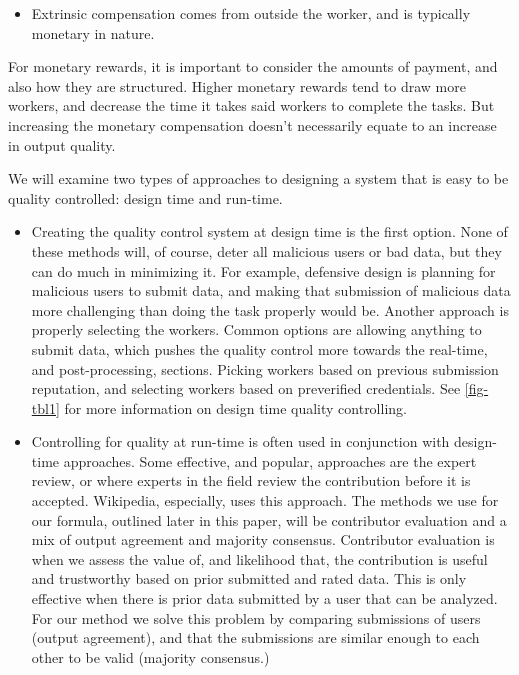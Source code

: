 \documentclass[9pt,twocolumn]{article}
\begin{document}
\begin{itemize}
\begin{itemize}
			\item Extrinsic compensation comes from outside the worker, and is typically monetary in nature.
		\end{itemize}
		For monetary rewards, it is important to consider the amounts of payment, and also how they are structured. Higher monetary rewards tend to draw more workers, and decrease the time it takes said workers to complete the tasks. But increasing the monetary compensation doesn't necessarily equate to an increase in output quality. \cite{mason2010financial}
	\end{itemize}
	
	We will examine two types of approaches to designing a system that is easy to be quality controlled: design time and run-time. 
	
	\begin{itemize}
		\item Creating the quality control system at design time is the first option. None of these methods will, of course, deter all malicious users or bad data, but they can do much in minimizing it. For example, defensive design is planning for malicious users to submit data, and making that submission of malicious data more challenging than doing the task properly would be. Another approach is properly selecting the workers. Common options are allowing anything to submit data, which pushes the quality control more towards the real-time, and post-processing, sections. Picking workers based on previous submission reputation, and selecting workers based on preverified credentials. See \cref{fig-tbl1} for more information on design time quality controlling.
	
		\item Controlling for quality at run-time is often used in conjunction with design-time approaches. Some effective, and popular, approaches are the expert review, or where experts in the field review the contribution before it is accepted. Wikipedia, especially, uses this approach. The methods we use for our formula, outlined later in this paper, will be contributor evaluation and a mix of output agreement and majority consensus. Contributor evaluation is when we assess the value of, and likelihood that, the contribution is useful and trustworthy based on prior submitted and rated data. This is only effective when there is prior data submitted by a user that can be analyzed. For our method we solve this problem by comparing submissions of users (output agreement), and that the submissions are similar enough to each other to be valid (majority consensus.)
	\end{itemize}
	
\end{document}
